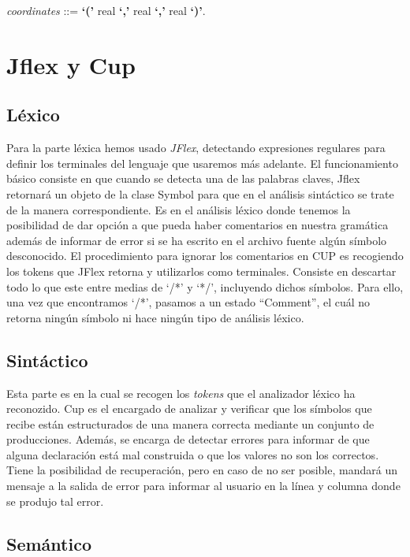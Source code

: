 \documentclass[12pt]{article}
\begin{document}
\noindent \textit{coordinates} ::= \textbf{`('} real \textbf{`,'} real \textbf{`,'} real \textbf{`)'}.

\section{Jflex y Cup}

\subsection{Léxico}

Para la parte léxica hemos usado \textit{JFlex}, detectando expresiones regulares para definir los terminales del lenguaje que usaremos más adelante.
El funcionamiento básico consiste en que cuando se detecta una de las palabras claves, Jflex retornará un objeto de la clase Symbol para que en el análisis sintáctico se trate de la manera correspondiente.
Es en el análisis léxico donde tenemos la posibilidad de dar opción a que pueda haber comentarios en nuestra gramática además de informar de error si se ha escrito en el archivo fuente algún símbolo desconocido. El procedimiento para ignorar los comentarios en CUP es recogiendo los tokens que JFlex retorna y utilizarlos como terminales. Consiste en descartar todo lo que este entre medias de `/*' y `*/', incluyendo dichos símbolos. Para ello, una vez que encontramos `/*', pasamos a un estado ``Comment'', el cuál no retorna ningún símbolo ni hace ningún tipo de análisis léxico.

\subsection{Sintáctico}

Esta parte es en la cual se recogen los \textit{tokens} que el analizador léxico ha reconozido. Cup es el encargado de analizar y verificar que los símbolos que recibe están estructurados de una manera correcta mediante un conjunto de producciones. Además, se encarga de detectar errores para informar de que alguna declaración está mal construida o que los valores no son los correctos. Tiene
la posibilidad de recuperación, pero en caso de no ser posible, mandará un mensaje a la salida de error para informar al usuario en la
línea y columna donde se produjo tal error.

\subsection{Semántico}
\end{document}
